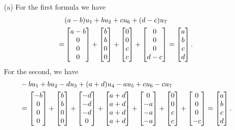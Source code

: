 \documentclass[a4paper]{amsart}
\renewenvironment{solution}{\SolutionInline}{\endSolutionInline}
\begin{document}
\begin{solution}
 \begin{itemize}
  \item[(a)] For the first formula we have
   \begin{align*}
    & (a-b)u_1 + b u_2 + c u_6 + (d-c)u_7 \\
    =& \left[\begin{matrix} a-b \\ 0 \\ 0 \\ 0 \end{matrix}\right] + 
       \left[\begin{matrix} b \\ b \\ 0 \\ 0 \end{matrix}\right] +
       \left[\begin{matrix} 0 \\ 0 \\ c \\ c \end{matrix}\right] + 
       \left[\begin{matrix} 0 \\ 0 \\ 0 \\ d-c \end{matrix}\right] 
    = \left[\begin{matrix} a \\ b \\ c \\ d \end{matrix}\right]. 
   \end{align*}
   For the second, we have
   \begin{align*}
    & -bu_1+bu_2-du_3+(a+d)u_4 -a u_5 + cu_6 -cu_7 \\
    &=  \bbm  -b \\   0 \\   0 \\   0 \ebm +
        \bbm   b \\   b \\   0 \\   0 \ebm +
        \bbm  -d \\  -d \\  -d \\   0 \ebm +
        \bbm a+d \\ a+d \\ a+d \\ a+d \ebm +
        \bbm   0 \\  -a \\  -a \\  -a \ebm +
        \bbm   0 \\   0 \\   c \\   c \ebm +
        \bbm   0 \\   0 \\   0 \\  -c \ebm 
      = \bbm   a \\   b \\   c \\   d \ebm.

\end{align*}
\end{itemize}
\end{solution}
\end{document}
